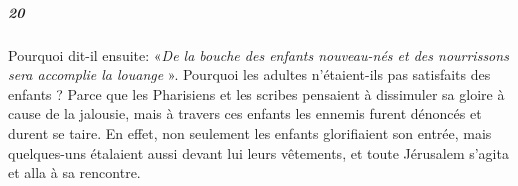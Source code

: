 \documentclass[a4paper]{article}
\begin{document}
\begin{pairs}
\beginnumbering

 


            \pstart
\subparagraph{20}\sloppy
Pourquoi dit-il ensuite: «\textit{De la bouche des enfants nouveau-nés et des nourrissons sera accomplie la louange}%
». Pourquoi les adultes n'étaient-ils pas satisfaits des enfants ? Parce que les Pharisiens et les scribes pensaient à dissimuler sa gloire à cause de la jalousie, mais à travers ces enfants les ennemis furent dénoncés et durent se taire. En effet, non seulement les enfants glorifiaient son entrée, mais quelques-uns étalaient aussi devant lui leurs vêtements, et toute Jérusalem s'agita et alla à sa rencontre.  
        \pend
    \endnumbering
\end{pairs}
\end{document}
